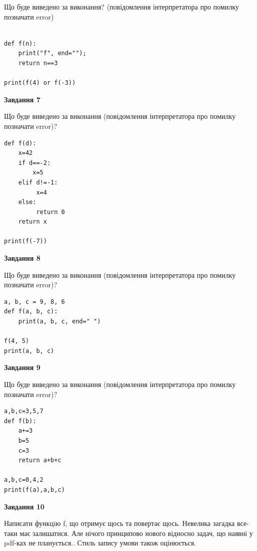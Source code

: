 \documentclass[12pt, ukrainian]{article}
\begin{document}
{\begin {large}
Що буде виведено за виконання? (повідомлення інтерпретатора про помилку позначати error)\par
\begin{verbatim}

def f(n):
    print("f", end="");
    return n==3

print(f(4) or f(-3))
\end{verbatim}

{\begin {center}\textbf{Завдання 7}\end {center}}

Що буде виведено за виконання (повідомлення інтерпретатора про помилку позначати error)?\par
\begin{verbatim}
def f(d):
    x=42
    if d==-2: 
        x=5
    elif d!=-1:
         x=4
    else:
         return 0
    return x

print(f(-7))
\end{verbatim}

{\begin {center}\textbf{Завдання 8}\end {center}}

Що буде виведено за виконання (повідомлення інтерпретатора про помилку позначати error)?\par
\begin{verbatim}
a, b, c = 9, 8, 6
def f(a, b, c):
    print(a, b, c, end=" ")

f(4, 5)
print(a, b, c)
\end{verbatim}

{\begin {center}\textbf{Завдання 9}\end {center}}

Що буде виведено за виконання (повідомлення інтерпретатора про помилку позначати error)?\par
\begin{verbatim}
a,b,c=3,5,7
def f(b):
    a+=3
    b=5
    c=3
    return a+b+c

a,b,c=0,4,2
print(f(a),a,b,c)
\end{verbatim}

{\begin {center}\textbf{Завдання 10}\end {center}}


Написати функцiю f, що отримує щось та повертає щось. Невелика загадка все-таки має залишатися. Але нічого принципово нового відносно задач, що наявні у pdf-ках не планується.. Стиль запису умови також оцінюється.\par
\end {large}}
\newpage
\end{document}
